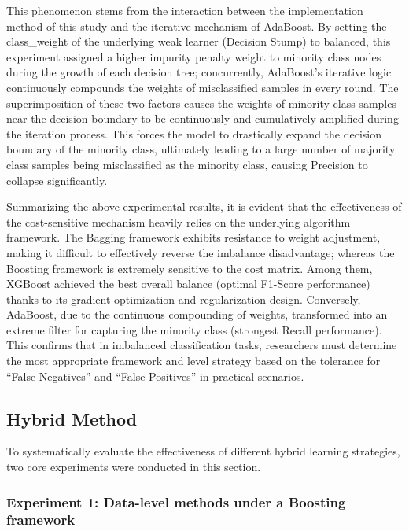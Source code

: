 \documentclass[sigconf]{acmart}
\begin{document}
This phenomenon stems from the interaction between the implementation method of this study and the iterative mechanism of AdaBoost. By setting the class\_weight of the underlying weak learner (Decision Stump) to balanced, this experiment assigned a higher impurity penalty weight to minority class nodes during the growth of each decision tree; concurrently, AdaBoost's iterative logic continuously compounds the weights of misclassified samples in every round. The superimposition of these two factors causes the weights of minority class samples near the decision boundary to be continuously and cumulatively amplified during the iteration process. This forces the model to drastically expand the decision boundary of the minority class, ultimately leading to a large number of majority class samples being misclassified as the minority class, causing Precision to collapse significantly. 

Summarizing the above experimental results, it is evident that the effectiveness of the cost-sensitive mechanism heavily relies on the underlying algorithm framework. The Bagging framework exhibits resistance to weight adjustment, making it difficult to effectively reverse the imbalance disadvantage; whereas the Boosting framework is extremely sensitive to the cost matrix. Among them, XGBoost achieved the best overall balance (optimal F1-Score performance) thanks to its gradient optimization and regularization design. Conversely, AdaBoost, due to the continuous compounding of weights, transformed into an extreme filter for capturing the minority class (strongest Recall performance). This confirms that in imbalanced classification tasks, researchers must determine the most appropriate framework and level strategy based on the tolerance for ``False Negatives'' and ``False Positives'' in practical scenarios. 





\subsection{Hybrid Method}

To systematically evaluate the effectiveness of different hybrid learning strategies, two core experiments were conducted in this section.  


\subsubsection{Experiment 1: Data-level methods under a Boosting framework}
\end{document}
